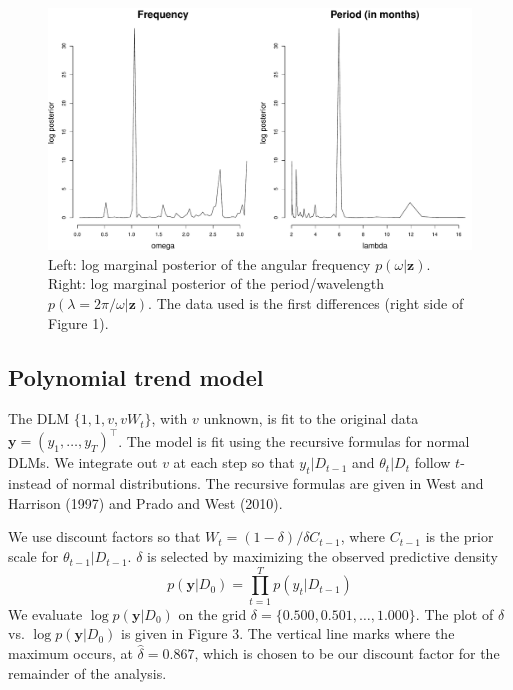 \documentclass[12pt]{article}
\newcommand{\m}[1]{\mathbf{\bm{#1}}}
\begin{document}
\begin{figure}[H]
\begin{center}
\includegraphics[scale=0.36]{figs/spectral.pdf}
\end{center}
\caption{Left: log marginal posterior of the angular frequency $p(\omega|\m{z})$. Right: log marginal posterior of the period/wavelength $p(\lambda=2\pi/\omega|\m{z})$. The data used is the first differences (right side of Figure 1).}
\end{figure}

\subsection*{Polynomial trend model}

\noindent The DLM $\{1,1,v,vW_t\}$, with $v$ unknown, is fit to the original data $\m{y}=(y_1,\ldots,y_T)^\top$. The model is fit using the recursive formulas for normal DLMs. We integrate out $v$ at each step so that $y_t|D_{t-1}$ and $\theta_t|D_t$ follow $t$- instead of normal distributions. The recursive formulas are given in West and Harrison (1997) and Prado and West (2010).
\bigskip

\noindent We use discount factors so that $W_t=(1-\delta)/\delta C_{t-1}$, where $C_{t-1}$ is the prior scale for $\theta_{t-1}|D_{t-1}$. $\delta$ is selected by maximizing the observed predictive density
\[ p(\m{y}|D_0) = \prod_{t=1}^T p(y_t|D_{t-1}) \]
\noindent We evaluate $\log p(\m{y}|D_0)$ on the grid $\delta=\{0.500, 0.501,\ldots,1.000\}$. The plot of $\delta$ vs. $\log p(\m{y}|D_0)$ is given in Figure 3. The vertical line marks where the maximum occurs, at $\hat{\delta}=0.867$, which is chosen to be our discount factor for the remainder of the analysis.
\end{document}
